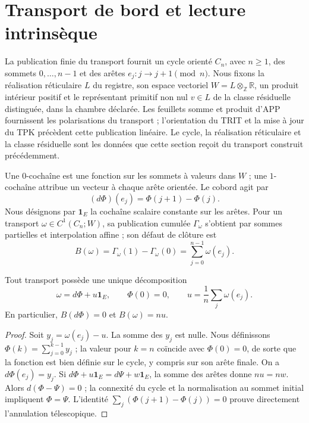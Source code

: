 \section{Transport de bord et lecture intrinsèque}
\label{x_reciprocidad:vii:sec:observador-ciclo}

La publication finie du transport fournit un cycle orienté
\(C_n\), avec \(n\geq1\), des sommets \(0,\ldots,n-1\) et des arêtes
\(e_j:j\longrightarrow j+1\pmod n\). Nous fixons la réalisation réticulaire
\(L\) du registre, son espace vectoriel
\(W=L\otimes_{\mathbb Z}\mathbb R\), un produit intérieur positif et
le représentant primitif non nul \(v\in L\) de la classe résiduelle
distinguée, dans la chambre déclarée. Les feuillets somme et produit d'APP
fournissent les polarisations du transport ; l'orientation du TRIT et la
mise à jour du TPK précèdent cette publication linéaire. Le cycle,
la réalisation réticulaire et la classe résiduelle sont les données que cette
section reçoit du transport construit précédemment.

Une \(0\)-cochaîne est une fonction sur les sommets à valeurs dans \(W\) ; une \(1\)-cochaîne attribue un vecteur à chaque arête orientée. Le cobord agit par
\[
 (d\Phi)(e_j)=\Phi(j+1)-\Phi(j).
\]
Nous désignons par \(\mathbf1_E\) la cochaîne scalaire constante sur les arêtes. Pour un transport \(\omega\in C^1(C_n;W)\), sa publication cumulée \(\Gamma_\omega\) s'obtient par sommes partielles et interpolation affine ; son défaut de clôture est
\begin{equation}
 B(\omega)=\Gamma_\omega(1)-\Gamma_\omega(0)
 =\sum_{j=0}^{n-1}\omega(e_j).
 \label{x_reciprocidad:vii:eq:observador-defecto}
\end{equation}

\begin{theorem}
\label{x_reciprocidad:vii:thm:observador-descomposicion}
Tout transport possède une unique décomposition
\[
 \omega=d\Phi+u\mathbf1_E,\qquad \Phi(0)=0,
 \qquad u=\frac1n\sum_j\omega(e_j).
\]
En particulier, \(B(d\Phi)=0\) et \(B(\omega)=nu\).
\end{theorem}

\begin{proof}
Soit \(y_j=\omega(e_j)-u\). La somme des \(y_j\) est nulle. Nous définissons \(\Phi(k)=\sum_{j=0}^{k-1}y_j\) ; la valeur pour \(k=n\) coïncide avec \(\Phi(0)=0\), de sorte que la fonction est bien définie sur le cycle, y compris sur son arête finale. On a \(d\Phi(e_j)=y_j\). Si \(d\Phi+u\mathbf1_E=d\Psi+w\mathbf1_E\), la somme des arêtes donne \(nu=nw\). Alors \(d(\Phi-\Psi)=0\) ; la connexité du cycle et la normalisation au sommet initial impliquent \(\Phi=\Psi\). L'identité \(\sum_j(\Phi(j+1)-\Phi(j))=0\) prouve directement l'annulation télescopique.
\end{proof}


